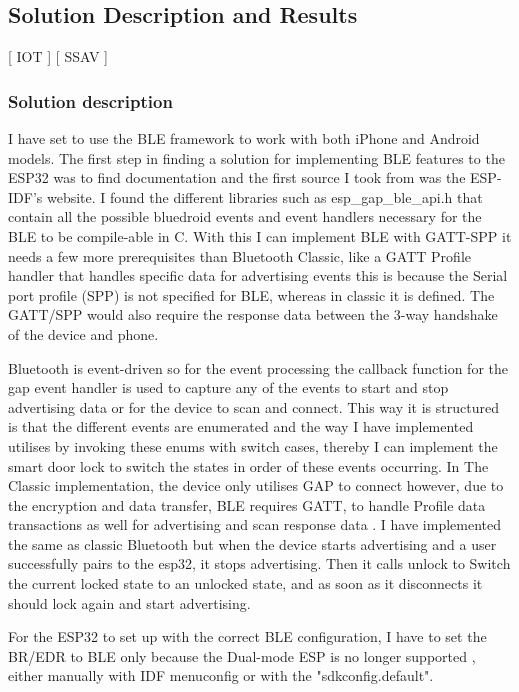 \subsection{Solution Description and Results}
[ IOT ] [ SSAV ] 
\newline
\subsubsection{\textbf{Solution description}}
 I have set to use the BLE framework to work with both iPhone and Android models. The first step in finding a solution for implementing BLE features to the ESP32 was to find documentation and the first source I took from was the ESP-IDF's website. I found the different libraries such as esp\_gap\_ble\_api.h that contain all the possible bluedroid events and event handlers necessary for the BLE to be compile-able in C. With this I can implement BLE with GATT-SPP it needs a few more prerequisites than Bluetooth Classic, like a GATT Profile handler that handles specific data for advertising events this is because the Serial port profile (SPP) is not specified for BLE, whereas in classic it is defined. The GATT/SPP would also require the response data between the 3-way handshake of the device and phone.
 
 Bluetooth is event-driven so for the event processing the callback function for the gap event handler is used to capture any of the events to start and stop advertising data or for the device to scan and connect. This way it is structured is that the different events are enumerated and the way I have implemented utilises by invoking these enums with switch cases, thereby I can implement the smart door lock to switch the states in order of these events occurring. In The Classic implementation, the device only utilises GAP to connect however, due to the encryption and data transfer, BLE requires GATT, to handle Profile data transactions as well for advertising and scan response data \cite{ESPBLEGAP}. I have implemented the same as classic Bluetooth but when the device starts advertising and a user successfully pairs to the esp32, it stops advertising. Then it calls unlock to Switch the current locked state to an unlocked state, and as soon as it disconnects it should lock again and start advertising. 

For the ESP32 to set up with the correct BLE configuration, I have to set the BR/EDR to BLE only because the Dual-mode ESP is no longer supported \cite{esp32beans}, either manually with IDF menuconfig or with the "sdkconfig.default". 

